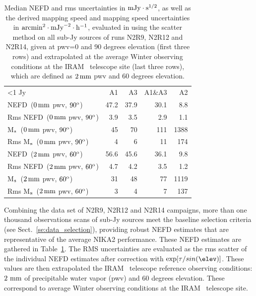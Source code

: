 \begin{table}[!thbp]
  \begin{center}
    \caption[NEFD estimates on all sub-Jy sources]{Median NEFD and rms
      uncertainties in $\rm{mJy}\cdot \rm{s}^{1/2}$, as well as the derived mapping
      speed and mapping speed uncertainties in $\rm{arcmin}^2\cdot\rm{mJy}^{-2}\cdot\rm{h}^{-1}$, evaluated
      in using the scatter method on all sub-Jy sources of runs N2R9, N2R12
      and N2R14, given at pwv=0 and 90 degrees elevation (first three rows) and extrapolated at the
      average Winter observing conditions at the IRAM
      \trentemetre\ telescope site (last three rows), which are defined
      as $2\,\rm{mm}$ pwv and 60 degrees elevation.}
    \label{tab:nefd_astro}
    \begin{tabular}{lrrrr}
      \hline\hline
      \noalign{\smallskip}
      <1 Jy               & A1      &   A3    &   A1\&A3 &    A2 \\
      \noalign{\smallskip}
      \hline
      \noalign{\smallskip}
      NEFD\, \small{($0\,\rm{mm}$ pwv, $90^{\rm{o}}$)}             & 47.2    & 37.9    &    30.1  &    8.8   \\
      Rms NEFD\, \small{($0\,\rm{mm}$ pwv, $90^{\rm{o}}$)}         &  3.9    &  3.5    &     2.9  &    1.1   \\
      M$_{\rm{s}}$\, \small{($0\,\rm{mm}$ pwv, $90^{\rm{o}}$)}      & 45      &  70     &    111   &   1388   \\
      Rms M$_{\rm{s}}$\, \small{($0\,\rm{mm}$ pwv, $90^{\rm{o}}$)}  &  4      &   6     &     11   &    174   \\
      \hline
      \noalign{\smallskip}
      NEFD\, \small{($2\,\rm{mm}$ pwv, $60^{\rm{o}}$)}             & 56.6    & 45.6    &    36.1  &    9.8   \\
      Rms NEFD\, \small{($2\,\rm{mm}$ pwv, $60^{\rm{o}}$)}         &  4.7    & 4.2     &     3.5  &    1.2   \\
      M$_{\rm{s}}$\, \small{($2\,\rm{mm}$ pwv, $60^{\rm{o}}$)}      &  31    & 48       &    77   &   1119   \\
      Rms M$_{\rm{s}}$\, \small{($2\,\rm{mm}$ pwv, $60^{\rm{o}}$)}  &   3    &  4       &     7     &  137   \\
      \hline
    \end{tabular}
\end{center}
\end{table}

Combining the data set of N2R9, N2R12 and N2R14 campaigns,
more than one thousand observations scans of sub-Jy sources meet the
baseline selection criteria (see Sect.~\ref{se:data_selection}),
providing robust NEFD estimates that are representative of the
average NIKA2 performance. These NEFD estimates are gathered in
Table~\ref{tab:nefd_astro}.
The RMS uncertainties are evaluated as the rms scatter of the
individual NEFD estimates after correction with
$\exp[\tau/sin(\elev)]$. These values are then extrapolated the IRAM
\trentemetre\ telescope reference observing conditions: $2~\rm{mm}$
of precipitable water vapor (pwv) and $60$ degrees elevation. These
correspond to average Winter observing conditions at the IRAM
\trentemetre\ telescope site.




